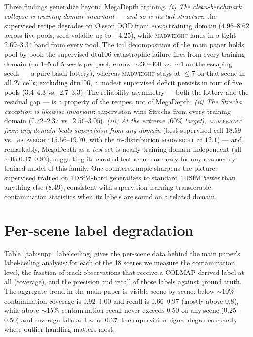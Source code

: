 \documentclass[10pt,twocolumn,letterpaper]{article}
\newcommand{\mad}{\textsc{madweight}}
\begin{document}
Three findings generalize beyond MegaDepth training. \emph{(i) The clean-benchmark
collapse is training-domain-invariant --- and so is its tail structure}: the
supervised recipe degrades on Olsson OOD from \emph{every} training domain
($4.96$--$8.62$ across five pools, seed-volatile up to $\pm4.25$), while \mad{} lands
in a tight $2.69$--$3.34$ band from every pool. The tail decomposition of the main
paper holds pool-by-pool: the supervised dtu106 catastrophic failure fires from every
training domain (on $1$--$5$ of $5$ seeds per pool, errors ${\sim}230$--$360$ vs.\
${\sim}1$ on the escaping seeds --- a pure basin lottery), whereas \mad{} stays at
${\le}7$ on that scene in all $27$ cells; excluding dtu106, a modest supervised
deficit persists in four of five pools ($3.4$--$4.3$ vs.\ $2.7$--$3.3$). The
reliability asymmetry --- both the lottery and the residual gap --- is a property of
the recipes, not of MegaDepth. \emph{(ii)
The Strecha exception is likewise invariant}: supervision wins Strecha from every
training domain ($0.72$--$2.37$ vs.\ $2.56$--$3.05$). \emph{(iii) At the extreme
($60\%$ target), \mad{} from any domain beats supervision from any domain} (best
supervised cell $18.59$ vs.\ \mad{} $15.56$--$19.70$, with the in-distribution
\mad{} at $12.1$) --- and, remarkably, MegaDepth as a \emph{test} set is nearly
training-domain-independent (all cells $0.47$--$0.83$), suggesting its curated test
scenes are easy for any reasonably trained model of this family. One
counterexample sharpens the picture: supervised trained on 1DSfM-hard generalizes to
standard 1DSfM \emph{better} than anything else ($8.49$), consistent with supervision
learning transferable contamination statistics when its labels are sound on a related
domain.

\section{Per-scene label degradation}\label{app:labeldeg}
Table~\ref{tab:supp_labelceiling} gives the per-scene data behind the main paper's
label-ceiling analysis: for each of the 18 scenes we measure the contamination level, the
fraction of track observations that receive a COLMAP-derived label at all (coverage), and
the precision and recall of those labels against ground truth. The aggregate trend in the main paper is visible scene by scene: below ${\sim}10\%$ contamination coverage is $0.92$--$1.00$ and recall is $0.66$--$0.97$ (mostly above $0.8$), while above ${\sim}15\%$ contamination recall never exceeds $0.50$ on any scene ($0.25$--$0.50$) and coverage falls as low as $0.37$: the supervision signal degrades exactly where outlier handling matters most.
\end{document}
